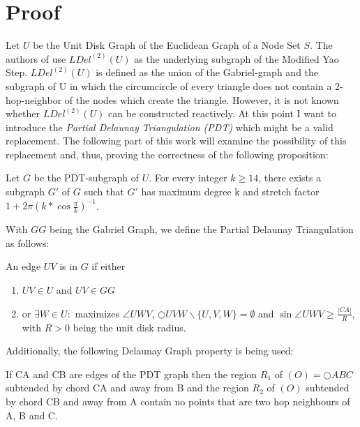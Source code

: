 \section{Proof}
Let $U $ be the Unit Disk Graph of the Euclidean Graph of a Node Set $S $.
The authors of \cite{kanj} use $LDel^{(2)}(U) $ as the underlying subgraph of the Modified Yao Step.
$LDel^{(2)}(U) $ is defined as the union of the Gabriel-graph and the subgraph of U in which the circumcircle of every triangle does not contain a 2-hop-neighbor of the nodes which create the triangle.
However, it is not known whether $LDel^{(2)}(U) $ can be constructed reactively.
At this point I want to introduce the \emph{Partial Delaunay Triangulation (PDT)} \cite{pdt} which might be a valid replacement.
The following part of this work will examine the possibility of this replacement and, thus, proving the correctness of the following proposition:

\begin{prop}
\label{mastertheorem}
Let $G $ be the PDT-subgraph of $U $.
For every integer $k \geq 14 $, there exists a subgraph $G' $ of $G $ such that $G' $ has maximum degree k and stretch factor $1+2\pi (k*\cos{\frac{\pi}{k}})^{-1} $.
\end{prop} 



With $GG $ being the Gabriel Graph, we define the Partial Delaunay Triangulation as follows:
\begin{definition}
\label{emptycircle}
An edge $UV $ is in $G $ if either 
\begin{enumerate}
\renewcommand{\labelenumi}{(\roman{enumi})}
 \item $UV \in U$ and $UV \in GG $
 \item or $\exists{W} \in U : $ maximizes $\angle{UWV} $, $\bigcirc{UVW}  \backslash \{U, V, W\} = \emptyset $ and $\sin{\angle{UWV}} \geq \frac{|CA|}{R} $, with $R>0 $ being the unit disk radius.
\end{enumerate} 
\end{definition}


Additionally, the following Delaunay Graph property is being used:
\begin{lemma}
\label{emptyregion}
If CA and CB are edges of the PDT graph then the region $R_1 $ of $(O)=\bigcirc{ABC} $ subtended by chord CA and away from B and the region $R_2 $ of $(O) $ subtended by chord CB and away from A contain no points that are two hop neighbours of A, B and C.
\end{lemma}


